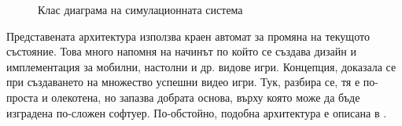		\begin{figure}
			\caption{Клас диаграма на симулационната система}
			\label{figure:simulation-class-diagram}
				\begin{center}
				\end{center}
		\end{figure}
		
		\newpage
		
		Представената архитектура използва краен автомат за промяна на текущото състояние.
		Това много напомня на начинът по който се създава дизайн и имплементация за мобилни, настолни
		и др. видове игри. Концепция, доказала се при създаването на множество успешни видео игри. 
		Тук, разбира се, тя е по-проста и олекотена, но запазва добрата основа, 
		върху която може да бъде изградена по-сложен софтуер. По-обстойно, подобна архитектура е описана в \cite{Rollings}.
		

